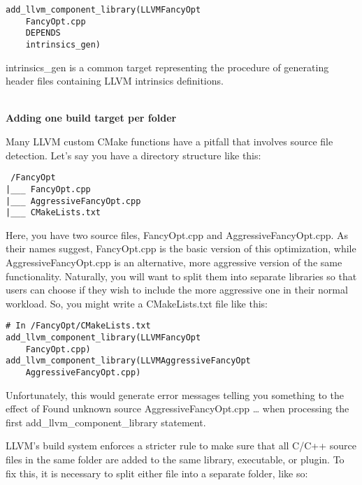 \begin{lstlisting}[style=styleCMake]
add_llvm_component_library(LLVMFancyOpt
	FancyOpt.cpp
	DEPENDS
	intrinsics_gen)
\end{lstlisting}

intrinsics\_gen is a common target representing the procedure of generating header files containing LLVM intrinsics definitions.

\hspace*{\fill} \\
\noindent
\textbf{Adding one build target per folder}

Many LLVM custom CMake functions have a pitfall that involves source file detection. Let's say you have a directory structure like this:

\begin{tcolorbox}[colback=white,colframe=black]
\tt
{}
/FancyOpt \\
\hspace*{0.5cm}|\_\_\_ FancyOpt.cpp \\
\hspace*{0.5cm}|\_\_\_ AggressiveFancyOpt.cpp \\
\hspace*{0.5cm}|\_\_\_ CMakeLists.txt
\end{tcolorbox}

Here, you have two source files, FancyOpt.cpp and AggressiveFancyOpt.cpp. As their names suggest, FancyOpt.cpp is the basic version of this optimization, while AggressiveFancyOpt.cpp is an alternative, more aggressive version of the same functionality. Naturally, you will want to split them into separate libraries so that users can choose if they wish to include the more aggressive one in their normal workload. So, you might write a CMakeLists.txt file like this:

\begin{lstlisting}[style=styleCMake]
# In /FancyOpt/CMakeLists.txt
add_llvm_component_library(LLVMFancyOpt
	FancyOpt.cpp)
add_llvm_component_library(LLVMAggressiveFancyOpt
	AggressiveFancyOpt.cpp)
\end{lstlisting}

Unfortunately, this would generate error messages telling you something to the effect of Found unknown source AggressiveFancyOpt.cpp … when processing the first add\_llvm\_component\_library statement.

LLVM's build system enforces a stricter rule to make sure that all C/C++ source files in the same folder are added to the same library, executable, or plugin. To fix this, it is necessary to split either file into a separate folder, like so:

